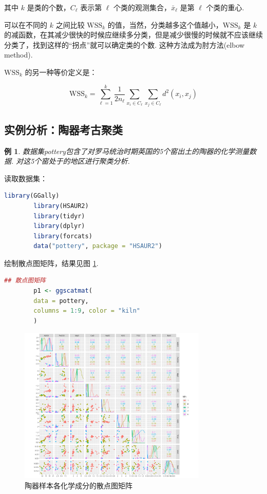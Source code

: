 \documentclass[12pt, a4paper, oneside]{ctexart}
\newtheorem{example}[theorem]{例}
\begin{document}
	其中 $k$ 是类的个数，$C_\ell$ 表示第 $\ell$ 个类的观测集合，$\bar{x}_\ell$ 是第 $\ell$ 个类的重心.
	
	可以在不同的 $k$ 之间比较 $\mathrm{WSS}_k$ 的值，当然，分类越多这个值越小，$\mathrm{WSS}_k$ 是 $k$ 的减函数，在其减少很快的时候应继续多分类，但是减少很慢的时候就不应该继续分类了，找到这样的“拐点”就可以确定类的个数. 这种方法成为肘方法(elbow method).
	
	$\mathrm{WSS}_k$ 的另一种等价定义是：
	
	\begin{equation}
		\mathrm{WSS}_k = \sum_{\ell=1}^{k} \frac{1}{2n_\ell} \sum_{x_i \in C_\ell} \sum_{x_j \in C_\ell} d^2(x_i, x_j)
		\label{WSS2}
	\end{equation}
	\subsection{实例分析：陶器考古聚类}
	\begin{example}
		数据集pottery包含了对罗马统治时期英国的5个窑出土的陶器的化学测量数据. 对这5个窑处于的地区进行聚类分析.
	\end{example}
	读取数据集：
	\begin{lstlisting}[language=R]
		library(GGally)
		library(HSAUR2)
		library(tidyr)
		library(dplyr)
		library(forcats)
		data("pottery", package = "HSAUR2")
	\end{lstlisting}
	
	绘制散点图矩阵，结果见图 \ref{fig:scatter_matrix}.
	\begin{lstlisting}[language=R]
		## 散点图矩阵
		p1 <- ggscatmat(
		data = pottery,
		columns = 1:9, color = "kiln"
		)
	\end{lstlisting}
	\begin{figure}[H]
		\centering
		\includegraphics[width=0.8\textwidth]{../Figure/scatter_matrix.png}
		\caption{陶器样本各化学成分的散点图矩阵}
		\label{fig:scatter_matrix}
	\end{figure}
	
\end{document}
